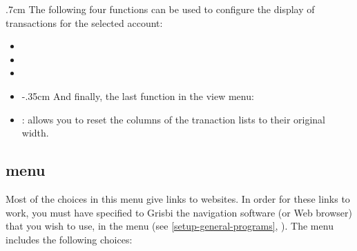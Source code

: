 \vspace{2mm}
\begin{addmargin*}[0pt]{.7cm} 	%
	The following four functions can be used to configure the display of transactions for the selected account:
\end{addmargin*}
\vspace{-2mm}
\begin{itemize}
	\item {}%
	\item {}%
	\item {}%
	\item {}%
	\vspace{2mm}
	\begin{addmargin*}[0pt]{-.35cm} 	%
	And finally, the last function in the view menu:%
	\end{addmargin*}	
	\item {}: allows you to reset the columns of the tranaction lists to their original width. 
\end{itemize}


\subsection{ menu\label{home-menus-help}}

Most of the choices in this menu give links to websites. In order for these links to work, you must have specified to Grisbi the navigation software (or Web browser) that you wish to use, in the  menu (see \vref{setup-general-programs}, ). The  menu includes the following choices:

